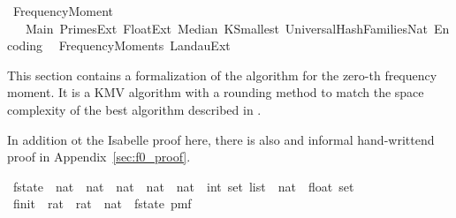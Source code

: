 %
\begin{isabellebody}%
%
%
\isadelimdocument
%
\endisadelimdocument
%
\isatagdocument
%
\isamarkuptrue%
%
\endisatagdocument
{\isafolddocument}%
%
\isadelimdocument
%
\endisadelimdocument
%
\isadelimtheory
%
\endisadelimtheory
%
\isatagtheory
{}\isamarkupfalse%
\ Frequency{\isacharunderscore}{\kern0pt}Moment{\isacharunderscore}{\kern0pt}{}\isanewline
\ \ \ Main\ Primes{\isacharunderscore}{\kern0pt}Ext\ Float{\isacharunderscore}{\kern0pt}Ext\ Median\ K{\isacharunderscore}{\kern0pt}Smallest\ Universal{\isacharunderscore}{\kern0pt}Hash{\isacharunderscore}{\kern0pt}Families{\isacharunderscore}{\kern0pt}Nat\ Encoding\isanewline
\ \ Frequency{\isacharunderscore}{\kern0pt}Moments\ Landau{\isacharunderscore}{\kern0pt}Ext\isanewline
{}%
\endisatagtheory
{\isafoldtheory}%
%
\isadelimtheory
%
\endisadelimtheory
%
\begin{isamarkuptext}%
This section contains a formalization of the algorithm for the zero-th frequency moment.
It is a KMV algorithm with a rounding method to match the space complexity of the best
algorithm described in \cite{baryossef2002}.%
\end{isamarkuptext}\isamarkuptrue%
%
\begin{isamarkuptext}%
In addition ot the Isabelle proof here, there is also and informal hand-writtend proof in
Appendix~\ref{sec:f0_proof}.%
\end{isamarkuptext}\isamarkuptrue%
\isamarkupfalse%
\ f{}{\isacharunderscore}{\kern0pt}state\ {\isacharequal}{\kern0pt}\ {\isachardoublequoteopen}nat\ {\isasymtimes}\ nat\ {\isasymtimes}\ nat\ {\isasymtimes}\ nat\ {\isasymtimes}\ {\isacharparenleft}{\kern0pt}nat\ {\isasymRightarrow}\ {\isacharparenleft}{\kern0pt}int\ set\ list{\isacharparenright}{\kern0pt}{\isacharparenright}{\kern0pt}\ {\isasymtimes}\ {\isacharparenleft}{\kern0pt}nat\ {\isasymRightarrow}\ float\ set{\isacharparenright}{\kern0pt}{\isachardoublequoteclose}\isanewline
\isanewline
{}\isamarkupfalse%
\ f{}{\isacharunderscore}{\kern0pt}init\ {\isacharcolon}{\kern0pt}{\isacharcolon}{\kern0pt}\ {\isachardoublequoteopen}rat\ {\isasymRightarrow}\ rat\ {\isasymRightarrow}\ nat\ {\isasymRightarrow}\ f{}{\isacharunderscore}{\kern0pt}state\ pmf{\isachardoublequoteclose}\ \isanewline

\end{isabellebody}
